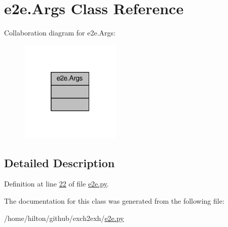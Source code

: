 \hypertarget{classe2e_1_1_args}{}\section{e2e.\+Args Class Reference}
\label{classe2e_1_1_args}


Collaboration diagram for e2e.\+Args\+:\nopagebreak
\begin{figure}[H]
\begin{center}
\leavevmode
\includegraphics[width=136pt]{classe2e_1_1_args__coll__graph}
\end{center}
\end{figure}


\subsection{Detailed Description}


Definition at line \hyperlink{e2e_8py_source_l00022}{22} of file \hyperlink{e2e_8py_source}{e2e.\+py}.



The documentation for this class was generated from the following file\+:\begin{DoxyCompactItemize}
\item 
/home/hilton/github/exch2exh/\hyperlink{e2e_8py}{e2e.\+py}\end{DoxyCompactItemize}
